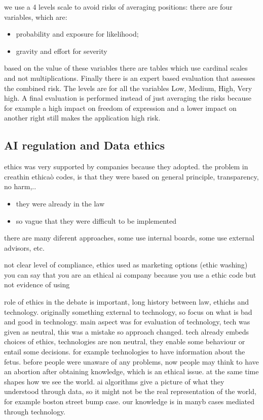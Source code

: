 we use a 4 levels scale to avoid risks of averaging positions:
there are four variables, which are:
\begin{itemize}
    \item probability and exposure for likelihood;
    \item gravity and effort for severity
\end{itemize}
based on the value of these variables there are tables which use cardinal scales and not multiplications. Finally there is an expert based evaluation that assesses the combined risk. The levels are for all the variables Low, Medium, High, Very high. 
A final evaluation is performed instead of just averaging the risks because for example a high impact on freedom of expression and a lower impact on another right still makes the application high risk.

\subsection{AI regulation and Data ethics}
ethics was very supported by companies because they adopted.
the problem in creathin ethicaò codes, is that they were based on general principle, transparency, no harm,..
\begin{itemize}
    \item they were already in the law
    \item so vague that they were difficult to be implemented
\end{itemize}

there are many diferent approaches, some use internal boards, some use external advisors, etc.

not clear level of compliance,
ethics used as marketing options (ethic washing) you can say that you are an ethical ai company because you use a ethic code but not evidence of using

role of ethics in the debate is important, long history between law, ethichs and technology. originally something external to technology, so focus on what is bad and good in technology. main aspect was for evaluation of technology, tech was given as neutral, this was a mistake so approach changed. tech already embeds choices of ethics, technologies are non neutral, they enable some behaviour or entail some decisions. for example technologies to have information about the fetus. before people were unaware of any problems, now people may think to have an abortion after obtaining knowledge, which is an ethical issue.
at the same time shapes how we see the world. ai algorithms give a picture of what they understood through data, so it might not be the real representation of the world, for example boston street bump case. our knowledge is in manyb cases mediated through technology.

